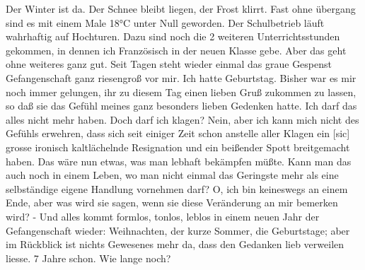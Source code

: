 \def\day{14. November 1943.}
\mktitle

Der Winter ist da.
Der Schnee bleibt liegen, der Frost klirrt.
Fast ohne \"{u}bergang sind es mit einem Male 18°C unter Null geworden.
Der Schulbetrieb l\"{a}uft wahrhaftig auf Hochturen.
Dazu sind noch die 2 weiteren Unterrichtsstunden gekommen, in dennen ich Franz\"{o}sisch in der neuen Klasse gebe.
Aber das geht ohne weiteres ganz gut.
Seit Tagen steht wieder einmal das graue Gespenst Gefangenschaft ganz riesengro{\ss} vor mir.
Ich hatte Geburtstag.
Bisher war es mir noch immer gelungen, ihr zu diesem Tag einen lieben Gru{\ss} zukommen zu lassen, so da{\ss} sie das Gef\"{u}hl meines ganz besonders lieben Gedenken hatte.
Ich darf das alles nicht mehr haben.
Doch darf ich klagen?
Nein, aber ich kann mich nicht des Gef\"{u}hls erwehren, dass sich seit einiger Zeit schon anstelle aller Klagen ein{\color{red} [sic] } grosse ironisch kaltl\"{a}chelnde Resignation und ein bei{\ss}ender Spott breitgemacht haben.
Das w\"{a}re nun etwas, was man lebhaft bek\"{a}mpfen m\"{u}{\ss}te.
Kann man das auch noch in einem Leben, wo man nicht einmal das Geringste mehr als eine selbst\"{a}ndige eigene Handlung vornehmen darf?
O, ich bin keineswegs an einem Ende, aber was wird sie sagen, wenn sie diese Ver\"{a}nderung an mir bemerken wird?
- Und alles kommt formlos, tonlos, leblos in einem neuen Jahr der Gefangenschaft wieder: Weihnachten, der kurze Sommer, die Geburtstage; aber im R\"{u}ckblick ist nichts Gewesenes mehr da, dass den Gedanken lieb verweilen liesse.
7 Jahre schon.
Wie lange noch?

\clearpage
